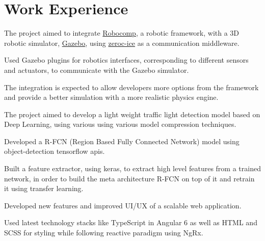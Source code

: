 \documentclass[]{deedy-resume-openfont}
\begin{document}
\lastupdated
{}

\section{Work Experience}

\begin{tightemize}
\item The project aimed to integrate \href{https://robocomp.github.io/web/}{Robocomp}, a robotic framework, with a 3D robotic simulator, \href{http://gazebosim.org}{Gazebo}, using \href{https://doc.zeroc.com/ice/3.6/}{zeroc-ice} as a communication middleware.
\item Used Gazebo plugins for robotics interfaces, corresponding to different sensors and actuators, to communicate with the Gazebo simulator.
\item The integration is expected to allow developers more options from the framework and provide a better simulation with a more realistic physics engine.
\end{tightemize}
\sectionsep

\begin{tightemize}
\item The project aimed to develop a light weight traffic light detection model based on Deep Learning, using various using various model compression techniques.
\item Developed a R-FCN (Region Based Fully Connected Network) model using object-detection tensorflow apis. 
\item Built a feature extractor, using keras, to extract high level features from a trained network, in order to build the meta architecture R-FCN on top of it and retrain it using transfer learning.
\end{tightemize}
\sectionsep

\begin{tightemize}
\item Developed new features and improved UI/UX of a scalable web application.
\item Used latest technology stacks like TypeScript in Angular 6 as well as HTML and SCSS for styling while following reactive paradigm using NgRx.
\end{tightemize}
\sectionsep
\end{document}
